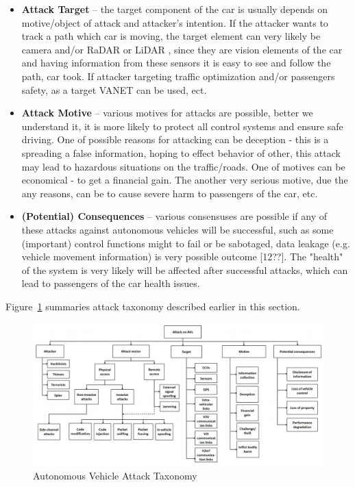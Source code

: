 \begin{itemize}
\begin{enumerate}
\begin{enumerate}
		\end{enumerate}    
	\end{enumerate}
		
	\item \textbf{Attack Target} -- the target component of the car is usually depends on motive/object of attack and attacker’s intention. If the attacker wants to track a path which car is moving, the target element can very likely be camera and/or \gls{RaDAR} or \gls{LiDAR} , since they are vision elements of the car and having information from these sensors it is easy to see and follow the path, car took. If attacker targeting traffic optimization and/or passengers safety, as a target \gls{VANET} can be used, ect.
	\item \textbf{Attack Motive} -- various motives for attacks are possible, better we understand it, it is more likely to protect all control systems and ensure safe driving. One of possible reasons for attacking can be deception - this is a spreading a false information, hoping to effect behavior of other, this attack may lead to hazardous situations on the traffic/roads. One of motives can be economical - to get a financial gain. The another very serious motive, due the any reasons, can be to cause severe harm to passengers of the car, etc.
	\item \textbf{(Potential) Consequences} -- various consensuses are possible if any of these attacks against autonomous vehicles will be successful, such as some (important) control functions might to fail or be sabotaged, data leakage (e.g. vehicle movement information) is very possible outcome [12??]. The "health" of the system is very likely will be affected after successful attacks, which can lead to passengers of the car health issues.
\end{itemize}

Figure~\ref{fig:AttackTaxonomy} summaries attack taxonomy described earlier in this section.

\begin{figure}[h]
	\centering  	
	\includegraphics[width=15cm]{img/6.jpg}
	\caption{Autonomous Vehicle Attack Taxonomy \cite{sec}}
	\label{fig:AttackTaxonomy}    
\end{figure}

